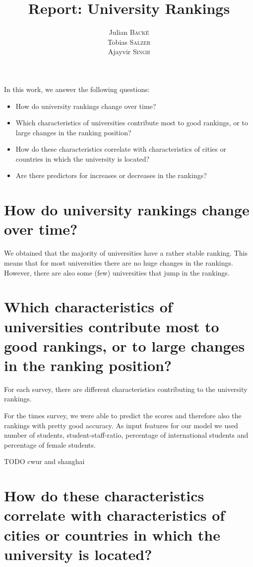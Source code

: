 \documentclass{article}
\title{Report: \textbf{University Rankings}} %
\author{Julian \textsc{Backé} \\ Tobias \textsc{Salzer} \\ Ajayvir \textsc{Singh}} %
\begin{document}
\maketitle %

In this work, we answer the following questions:

\begin{itemize}
	\item How do university rankings change over time? 
	
	\item Which characteristics of universities contribute most to good rankings, or to large changes in the ranking position? 
	
	\item How do these characteristics correlate with characteristics of cities or countries in which the university is located? 
	
	\item Are there predictors for increases or decreases in the rankings?
\end{itemize}

\section*{\large{How do university rankings change over time?}}
We obtained that the majority of universities have a rather stable ranking. This means that for most universities there are no huge changes in the rankings. However, there are also some (few) universities that jump in the rankings.

\section*{\large{Which characteristics of universities contribute most to good rankings, or to large changes in the ranking position?}}

For each survey, there are different characteristics contributing to the university rankings.

For the times survey, we were able to predict the scores and therefore also the rankings with pretty good accuracy. As input features for our model we used number of students, student-staff-ratio, percentage of international students and percentage of female students.

TODO cwur and shanghai

\section*{\large{How do these characteristics correlate with characteristics of cities or countries in which the university is located?}}
\end{document}

